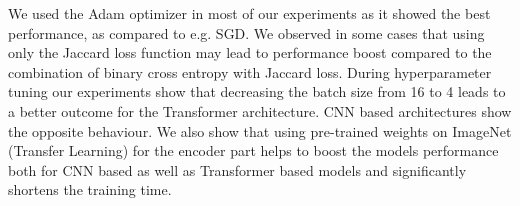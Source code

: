 \par
We used the Adam optimizer in most of our experiments as it showed the best performance, as compared to e.g. SGD. We observed in some cases that using only the Jaccard loss function may lead to performance boost compared to the combination of binary cross entropy with Jaccard loss. During hyperparameter tuning our experiments show that decreasing the batch size from 16 to 4 leads to a better outcome for the Transformer architecture. CNN based architectures show the opposite behaviour. We also show that using pre-trained weights on ImageNet (Transfer Learning) for the encoder part helps to boost the models performance both for CNN based as well as Transformer based models and significantly shortens the training time.


